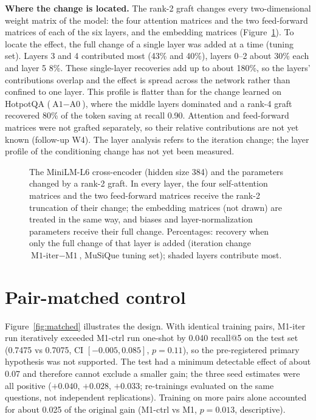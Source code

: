 \textbf{Where the change is located.} The rank-2 graft changes every two-dimensional weight matrix of the model: the four attention matrices and the two feed-forward matrices of each of the six layers, and the embedding matrices (Figure~\ref{fig:architecture}). To locate the effect, the full change of a single layer was added at a time (tuning set). Layers 3 and 4 contributed most (43\% and 40\%), layers 0--2 about 30\% each and layer 5 8\%. These single-layer recoveries add up to about 180\%, so the layers' contributions overlap and the effect is spread across the network rather than confined to one layer. This profile is flatter than for the change learned on HotpotQA ($\text{A1}-\text{A0}$), where the middle layers dominated and a rank-4 graft recovered 80\% of the token saving at recall 0.90. Attention and feed-forward matrices were not grafted separately, so their relative contributions are not yet known (follow-up W4). The layer analysis refers to the iteration change; the layer profile of the conditioning change has not yet been measured.

\begin{figure}[htbp]
\centering
\resizebox{\textwidth}{!}{}
\caption{The MiniLM-L6 cross-encoder (hidden size 384) and the parameters changed by a rank-2 graft. In every layer, the four self-attention matrices and the two feed-forward matrices receive the rank-2 truncation of their change; the embedding matrices (not drawn) are treated in the same way, and biases and layer-normalization parameters receive their full change. Percentages: recovery when only the full change of that layer is added (iteration change $\text{M1-iter}-\text{M1}$, MuSiQue tuning set); shaded layers contribute most.}
\label{fig:architecture}
\end{figure}

\section{Pair-matched control}
\label{sec:res_matched}

Figure~\ref{fig:matched} illustrates the design. With identical training pairs, M1-iter run iteratively exceeded M1-ctrl run one-shot by 0.040 recall@5 on the test set (0.7475 vs 0.7075, CI $[-0.005, 0.085]$, $p=0.11$), so the pre-registered primary hypothesis was not supported. The test had a minimum detectable effect of about 0.07 and therefore cannot exclude a smaller gain; the three seed estimates were all positive ($+0.040$, $+0.028$, $+0.033$; re-trainings evaluated on the same questions, not independent replications). Training on more pairs alone accounted for about 0.025 of the original gain (M1-ctrl vs M1, $p=0.013$, descriptive).

